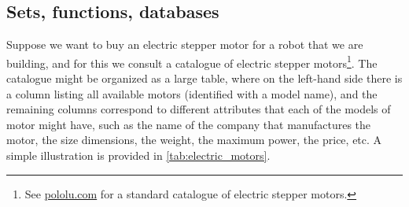 \label{sec:attributes_sameness}
\subsection{Sets, functions, databases}

Suppose we want to buy an electric stepper motor for a robot that we are building, and for this we consult a catalogue of electric stepper motors\footnote{See \href{https://www.pololu.com/category/87/stepper-motors}{pololu.com} for a standard catalogue of electric stepper motors.}. The catalogue might be organized as a large table, where on the left-hand side there is a column listing all available motors (identified with a model name), and the remaining columns correspond to different attributes that each of the models of motor might have, such as the name of the company that manufactures the motor, the size dimensions, the weight, the maximum power, the price, etc. A simple illustration is provided in \cref{tab:electric_motors}.
\begin{table}[h]
    \centering
    \caption{A simplified catalogue of motors.}
    \label{tab:electric_motors}
\end{table}

